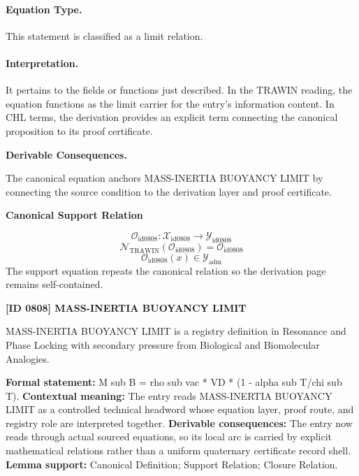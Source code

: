 \paragraph{Equation Type.}
This statement is classified as a limit relation.

\paragraph{Interpretation.}
It pertains to the fields or functions just described. In the TRAWIN reading, the equation functions as the limit carrier for the entry’s information content. In CHL terms, the derivation provides an explicit term connecting the canonical proposition to its proof certificate.

\par\vspace{0.35em}
\noindent\textbf{Derivable Consequences.}\quad
\begingroup
\footnotesize
\raggedright
The canonical equation anchors MASS-INERTIA BUOYANCY LIMIT by connecting the source condition to the derivation layer and proof certificate.
\par\endgroup

\noindent\textbf{Canonical Support Relation}\par
\[
\mathcal{O}_{\mathrm{id0808}}:\mathcal{X}_{\mathrm{id0808}}\longrightarrow\mathcal{Y}_{\mathrm{id0808}}
\]
\[
\mathcal{N}_{\mathrm{TRAWIN}}(\mathcal{O}_{\mathrm{id0808}})=\mathcal{O}_{\mathrm{id0808}}
\]
\[
\mathcal{O}_{\mathrm{id0808}}(x)\in\mathcal{Y}_{\mathrm{adm}}
\]
\noindent The support equation repeats the canonical relation so the derivation page remains self-contained.\par

\clearpage
\noindent\textbf{[ID 0808] MASS-INERTIA BUOYANCY LIMIT}\par
\vspace{0.35em}
\begingroup\small
{}
MASS-INERTIA BUOYANCY LIMIT is a registry definition in Resonance and Phase Locking with secondary pressure from Biological and Biomolecular Analogies.

\begingroup\footnotesize\setlength{\emergencystretch}{3em}\sloppy
\textbf{Formal statement:} M sub B = rho sub vac * VD * (1 - alpha sub T/chi sub T). \textbf{Contextual meaning:} The entry reads MASS-INERTIA BUOYANCY LIMIT as a controlled technical headword whose equation layer, proof route, and registry role are interpreted together. \textbf{Derivable consequences:} The entry now reads through actual sourced equations, so its local arc is carried by explicit mathematical relations rather than a uniform quaternary certificate record shell. \textbf{Lemma support:} Canonical Definition; Support Relation; Closure Relation.\par
\endgroup

